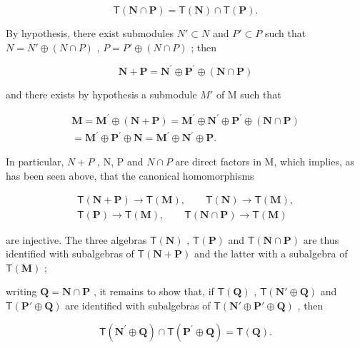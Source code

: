 \[
\mathsf {T} (\mathbf {N} \cap \mathbf {P}) = \mathsf {T} (\mathbf {N}) \cap \mathsf {T} (\mathbf {P}).\tag{5}
\]

By hypothesis, there exist submodules \(N' \subset N\) and \(P' \subset P\) such that \(N = N' \oplus (N \cap P)\) , \(P = P' \oplus (N \cap P)\) ; then

\[
\mathbf {N} + \mathbf {P} = \mathbf {N} ^ {\prime} \oplus \mathbf {P} ^ {\prime} \oplus (\mathbf {N} \cap \mathbf {P})
\]

and there exists by hypothesis a submodule \(M'\) of M such that

\[
\begin{array}{c} \mathbf {M} = \mathbf {M} ^ {\prime} \oplus (\mathbf {N} + \mathbf {P}) = \mathbf {M} ^ {\prime} \oplus \mathbf {N} ^ {\prime} \oplus \mathbf {P} ^ {\prime} \oplus (\mathbf {N} \cap \mathbf {P}) \\ = \mathbf {M} ^ {\prime} \oplus \mathbf {P} ^ {\prime} \oplus \mathbf {N} = \mathbf {M} ^ {\prime} \oplus \mathbf {N} ^ {\prime} \oplus \mathbf {P}. \end{array}
\]

In particular, \(N + P\) , N, P and \(N \cap P\) are direct factors in M, which implies, as has been seen above, that the canonical homomorphisms

\[
\begin{array}{l} \mathsf {T} (\mathbf {N} + \mathbf {P}) \to \mathsf {T} (\mathbf {M}), \qquad \mathsf {T} (\mathbf {N}) \to \mathsf {T} (\mathbf {M}), \\ \mathsf {T} (\mathbf {P}) \to \mathsf {T} (\mathbf {M}), \qquad \mathsf {T} (\mathbf {N} \cap \mathbf {P}) \to \mathsf {T} (\mathbf {M}) \end{array}
\]

are injective. The three algebras \(\mathsf{T}(\mathbf{N})\) , \(\mathsf{T}(\mathbf{P})\) and \(\mathsf{T}(\mathbf{N} \cap \mathbf{P})\) are thus identified with subalgebras of \(\mathsf{T}(\mathbf{N} + \mathbf{P})\) and the latter with a subalgebra of \(\mathsf{T}(\mathbf{M})\) ;

writing \(\mathbf{Q} = \mathbf{N} \cap \mathbf{P}\) , it remains to show that, if \(\mathsf{T}(\mathbf{Q})\) , \(\mathsf{T}(\mathbf{N}' \oplus \mathbf{Q})\) and \(\mathsf{T}(\mathbf{P}' \oplus \mathbf{Q})\) are identified with subalgebras of \(\mathsf{T}(\mathbf{N}' \oplus \mathbf{P}' \oplus \mathbf{Q})\) , then

\[
\mathsf {T} (\mathbf {N} ^ {\prime} \oplus \mathbf {Q}) \cap \mathsf {T} (\mathbf {P} ^ {\prime} \oplus \mathbf {Q}) = \mathsf {T} (\mathbf {Q}).\tag{6}
\]

